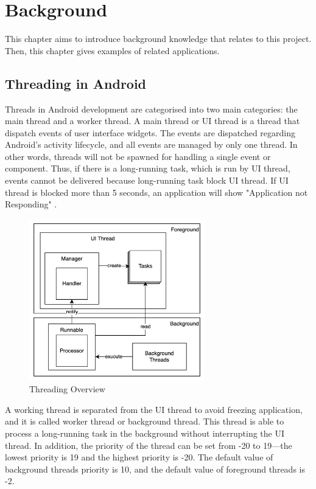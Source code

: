 \chapter{Background}\label{background}

    This chapter aims to introduce background knowledge that relates to this project.
    Then, this chapter gives examples of related applications.

    \section{Threading in Android}
        Threads in Android development are categorised into two main categories: the main thread and a worker thread.
        A main thread or UI thread is a thread that dispatch events of user interface widgets.
        The events are dispatched regarding Android's activity lifecycle,
        and all events are managed by only one thread.
        In other words, threads will not be spawned for handling a single event or component.
        Thus, if there is a long-running task, which is run by UI thread, events cannot be delivered
        because long-running task block UI thread.
        If UI thread is blocked more than 5 seconds,
        an application will show "Application not Responding"  \cite{ANDROID-01}.

        \begin{figure}[!ht]
            \centering
            \includegraphics[width=3in]{images/chapter2/thread-overview.png}
            \caption{Threading Overview}
            \label{thread-overview}
        \end{figure}

        A working thread is separated from the UI thread to avoid freezing application,
            and it is called worker thread or background thread.
            This thread is able to process a long-running task in the background without interrupting the UI thread.
        In addition, the priority of the thread can be set from -20 to 19---the lowest priority is 19 and the highest priority is -20.
            The default value of background threads priority is 10,
            and the default value of foreground threads is -2.

